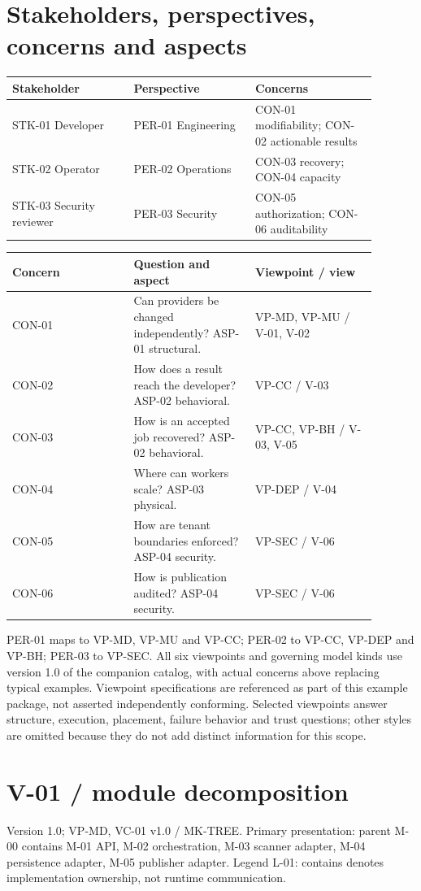 \documentclass[11pt,letterpaper]{article}
\newcommand{\docsection}[1]{\Needspace{5\baselineskip}\section{#1}}
\begin{document}
\docsection{Stakeholders, perspectives, concerns and aspects}
\begin{longtable}{@{}>{\RaggedRight\arraybackslash}p{0.297\linewidth}>{\RaggedRight\arraybackslash}p{0.297\linewidth}>{\RaggedRight\arraybackslash}p{0.297\linewidth}@{}}
\toprule
\textbf{Stakeholder} & \textbf{Perspective} & \textbf{Concerns}\\\midrule
\endhead
STK-01 Developer & PER-01 Engineering & CON-01 modifiability; CON-02 actionable results\\
STK-02 Operator & PER-02 Operations & CON-03 recovery; CON-04 capacity\\
STK-03 Security reviewer & PER-03 Security & CON-05 authorization; CON-06 auditability\\
\bottomrule
\end{longtable}
\begin{longtable}{@{}>{\RaggedRight\arraybackslash}p{0.297\linewidth}>{\RaggedRight\arraybackslash}p{0.297\linewidth}>{\RaggedRight\arraybackslash}p{0.297\linewidth}@{}}
\toprule
\textbf{Concern} & \textbf{Question and aspect} & \textbf{Viewpoint / view}\\\midrule
\endhead
CON-01 & Can providers be changed independently? ASP-01 structural. & VP-MD, VP-MU / V-01, V-02\\
CON-02 & How does a result reach the developer? ASP-02 behavioral. & VP-CC / V-03\\
CON-03 & How is an accepted job recovered? ASP-02 behavioral. & VP-CC, VP-BH / V-03, V-05\\
CON-04 & Where can workers scale? ASP-03 physical. & VP-DEP / V-04\\
CON-05 & How are tenant boundaries enforced? ASP-04 security. & VP-SEC / V-06\\
CON-06 & How is publication audited? ASP-04 security. & VP-SEC / V-06\\
\bottomrule
\end{longtable}
PER-01 maps to VP-MD, VP-MU and VP-CC; PER-02 to VP-CC, VP-DEP and VP-BH; PER-03 to VP-SEC. All six viewpoints and governing model kinds use version 1.0 of the companion catalog, with actual concerns above replacing typical examples. Viewpoint specifications are referenced as part of this example package, not asserted independently conforming. Selected viewpoints answer structure, execution, placement, failure behavior and trust questions; other styles are omitted because they do not add distinct information for this scope.

\docsection{V-01 / module decomposition}
Version 1.0; VP-MD, VC-01 v1.0 / MK-TREE. Primary presentation: parent M-00 contains M-01 API, M-02 orchestration, M-03 scanner adapter, M-04 persistence adapter, M-05 publisher adapter. Legend L-01: contains denotes implementation ownership, not runtime communication.
\end{document}
